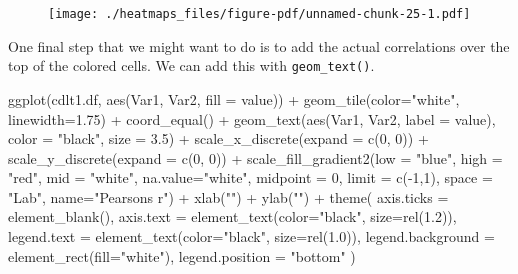 \documentclass[
  letterpaper,
  DIV=11,
  numbers=noendperiod]{scrreprt}
\newenvironment{Shaded}{\begin{snugshade}}{\end{snugshade}}
\newcommand{\AttributeTok}[1]{\textcolor[rgb]{0.40,0.45,0.13}{#1}}
\newcommand{\DecValTok}[1]{\textcolor[rgb]{0.68,0.00,0.00}{#1}}
\newcommand{\FloatTok}[1]{\textcolor[rgb]{0.68,0.00,0.00}{#1}}
\newcommand{\FunctionTok}[1]{\textcolor[rgb]{0.28,0.35,0.67}{#1}}
\newcommand{\NormalTok}[1]{\textcolor[rgb]{0.00,0.23,0.31}{#1}}
\newcommand{\SpecialCharTok}[1]{\textcolor[rgb]{0.37,0.37,0.37}{#1}}
\newcommand{\StringTok}[1]{\textcolor[rgb]{0.13,0.47,0.30}{#1}}
\begin{document}
\begin{figure}[H]

{\centering \texttt{[image: ./heatmaps\_files/figure-pdf/unnamed-chunk-25-1.pdf]}

}

\end{figure}

One final step that we might want to do is to add the actual
correlations over the top of the colored cells. We can add this with
\texttt{geom\_text()}.

\begin{Shaded}
\begin{Highlighting}[]
\FunctionTok{ggplot}\NormalTok{(cdlt1.df, }\FunctionTok{aes}\NormalTok{(Var1, Var2, }\AttributeTok{fill =}\NormalTok{ value)) }\SpecialCharTok{+} 
  \FunctionTok{geom\_tile}\NormalTok{(}\AttributeTok{color=}\StringTok{"white"}\NormalTok{, }\AttributeTok{linewidth=}\FloatTok{1.75}\NormalTok{) }\SpecialCharTok{+}
  \FunctionTok{coord\_equal}\NormalTok{() }\SpecialCharTok{+}
  \FunctionTok{geom\_text}\NormalTok{(}\FunctionTok{aes}\NormalTok{(Var1, Var2, }\AttributeTok{label =}\NormalTok{ value), }\AttributeTok{color =} \StringTok{"black"}\NormalTok{, }\AttributeTok{size =} \FloatTok{3.5}\NormalTok{) }\SpecialCharTok{+}
  \FunctionTok{scale\_x\_discrete}\NormalTok{(}\AttributeTok{expand =} \FunctionTok{c}\NormalTok{(}\DecValTok{0}\NormalTok{, }\DecValTok{0}\NormalTok{)) }\SpecialCharTok{+}
  \FunctionTok{scale\_y\_discrete}\NormalTok{(}\AttributeTok{expand =} \FunctionTok{c}\NormalTok{(}\DecValTok{0}\NormalTok{, }\DecValTok{0}\NormalTok{)) }\SpecialCharTok{+} 
  \FunctionTok{scale\_fill\_gradient2}\NormalTok{(}\AttributeTok{low =} \StringTok{"blue"}\NormalTok{, }\AttributeTok{high =} \StringTok{"red"}\NormalTok{, }\AttributeTok{mid =} \StringTok{"white"}\NormalTok{,}
                       \AttributeTok{na.value=}\StringTok{"white"}\NormalTok{,}
                       \AttributeTok{midpoint =} \DecValTok{0}\NormalTok{, }\AttributeTok{limit =} \FunctionTok{c}\NormalTok{(}\SpecialCharTok{{-}}\DecValTok{1}\NormalTok{,}\DecValTok{1}\NormalTok{), }\AttributeTok{space =} \StringTok{"Lab"}\NormalTok{, }
                       \AttributeTok{name=}\StringTok{"Pearson\textquotesingle{}s r"}\NormalTok{)  }\SpecialCharTok{+}
  \FunctionTok{xlab}\NormalTok{(}\StringTok{""}\NormalTok{) }\SpecialCharTok{+} 
  \FunctionTok{ylab}\NormalTok{(}\StringTok{""}\NormalTok{) }\SpecialCharTok{+}
  \FunctionTok{theme}\NormalTok{(}
    \AttributeTok{axis.ticks =} \FunctionTok{element\_blank}\NormalTok{(), }
    \AttributeTok{axis.text =} \FunctionTok{element\_text}\NormalTok{(}\AttributeTok{color=}\StringTok{"black"}\NormalTok{, }\AttributeTok{size=}\FunctionTok{rel}\NormalTok{(}\FloatTok{1.2}\NormalTok{)),}
    \AttributeTok{legend.text =} \FunctionTok{element\_text}\NormalTok{(}\AttributeTok{color=}\StringTok{"black"}\NormalTok{, }\AttributeTok{size=}\FunctionTok{rel}\NormalTok{(}\FloatTok{1.0}\NormalTok{)),}
    \AttributeTok{legend.background =} \FunctionTok{element\_rect}\NormalTok{(}\AttributeTok{fill=}\StringTok{"white"}\NormalTok{),}
    \AttributeTok{legend.position =} \StringTok{"bottom"}
\NormalTok{  ) }
\end{Highlighting}
\end{Shaded}
\end{document}
